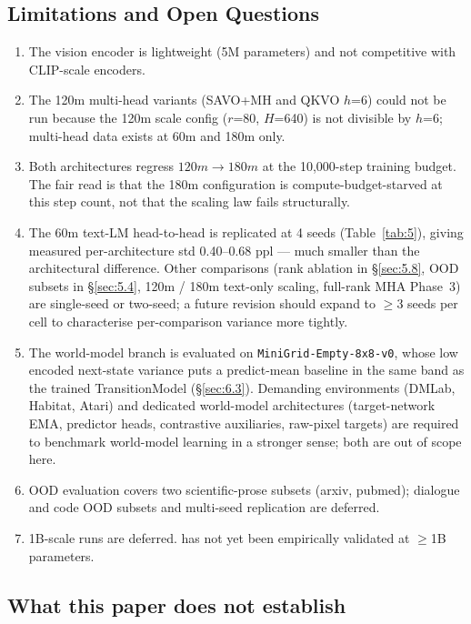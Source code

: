 \subsection{Limitations and Open Questions}\label{sec:6.5}

\begin{enumerate}
  \item The vision encoder is lightweight (5M parameters) and not competitive with CLIP-scale encoders.
  \item The 120m multi-head variants (SAVO+MH and QKVO $h$=6) could not be run because the 120m scale config ($r$=80, $H$=640) is not divisible by $h$=6; multi-head data exists at 60m and 180m only.
  \item Both architectures regress $120m \to 180m$ at the 10,000-step training budget. The fair read is that the 180m configuration is compute-budget-starved at this step count, not that the scaling law fails structurally.
  \item The 60m text-LM head-to-head is replicated at 4 seeds (Table~\ref{tab:5}), giving measured per-architecture std 0.40--0.68 ppl --- much smaller than the architectural difference. Other comparisons (rank ablation in \S\ref{sec:5.8}, OOD subsets in \S\ref{sec:5.4}, 120m / 180m text-only scaling, full-rank MHA Phase~3) are single-seed or two-seed; a future revision should expand to $\geq$3 seeds per cell to characterise per-comparison variance more tightly.
  \item The world-model branch is evaluated on \texttt{MiniGrid-Empty-8x8-v0}, whose low encoded next-state variance puts a predict-mean baseline in the same band as the trained TransitionModel (\S\ref{sec:6.3}). Demanding environments (DMLab, Habitat, Atari) and dedicated world-model architectures (target-network EMA, predictor heads, contrastive auxiliaries, raw-pixel targets) are required to benchmark world-model learning in a stronger sense; both are out of scope here.
  \item OOD evaluation covers two scientific-prose subsets (arxiv, pubmed); dialogue and code OOD subsets and multi-seed replication are deferred.
  \item 1B-scale runs are deferred. \QC{} has not yet been empirically validated at $\geq$1B parameters.
\end{enumerate}

\subsection{What this paper does not establish}\label{sec:6.6}


